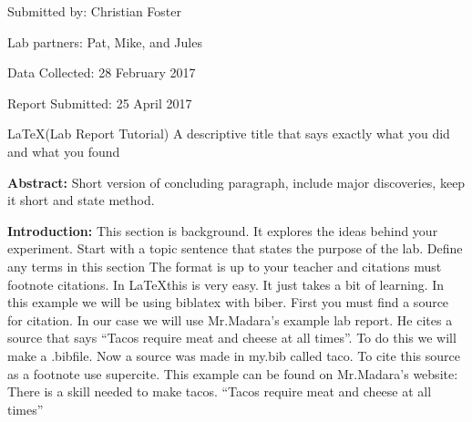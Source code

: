 \documentclass{report}
\begin{document}
 

\hfill Submitted by: Christian Foster 

\hfill Lab partners: Pat, Mike, and Jules 

\hfill Data Collected: 28 February 2017 

\hfill Report Submitted: 25 April 2017

\begin{center}
\fontsize{18pt}{12pt}\selectfont 
\LaTeX (Lab Report Tutorial) A descriptive title that says exactly what you did and what you found
\end{center}
\begin{flushleft}
\textbf{Abstract:} Short version of concluding paragraph, include major discoveries, keep it short and state method.
\end{flushleft}
\begin{flushleft}
	\textbf{Introduction:} This section is background. It explores the ideas behind your experiment. Start with a topic sentence that states the purpose of the lab. Define any terms in this section The format is up to your teacher and citations must footnote citations. In \LaTeX this is very easy. It just takes a bit of learning. In this example we will be using biblatex with biber. First you must find a source for citation. In our case we will use Mr.Madara's example lab report. He cites a source that says ``Tacos require meat and cheese at all times''. To do this we will make a .bibfile. Now a source was made in my.bib called taco. To cite this source as a footnote use supercite. This example can be found on Mr.Madara's website:\supercite{madara}
	There is a skill needed to make tacos. ``Tacos require meat and cheese at all times''
\end{flushleft}
\printbibliography
\end{document}
